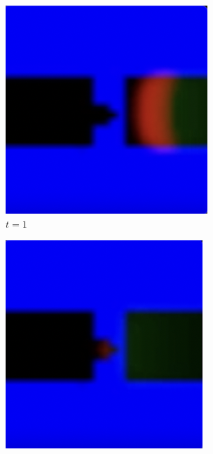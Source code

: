 \begin{figure}
	\begin{subfigure}{0.24\textwidth}
		\includegraphics[width=\linewidth]{diode/hard/Screenshot 2024-03-09 at 16.23.41.png}
		\caption*{$t = 1$}
	\end{subfigure}
	\begin{subfigure}{0.24\textwidth}
		\includegraphics[width=\linewidth]{diode/hard/Screenshot 2024-03-09 at 16.23.48.png}

\end{subfigure}
\end{figure}
